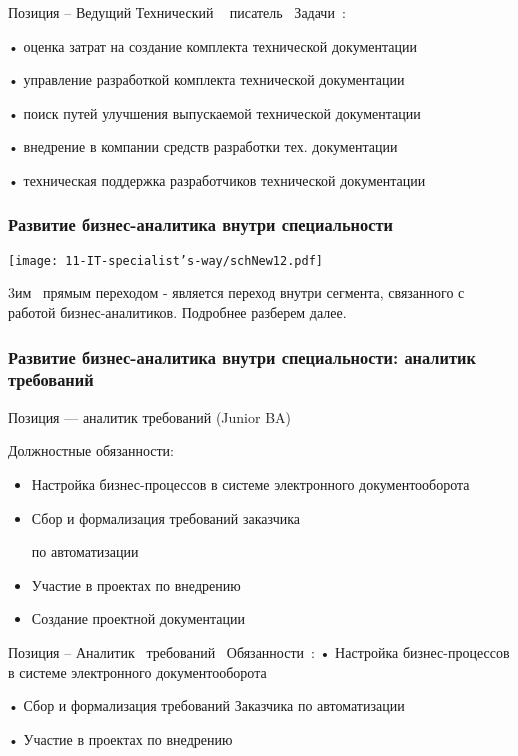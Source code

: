 \documentclass{../industrial-development}
\begin{document}
\lecturenotes

Позиция – Ведущий Технический ~\cite{hh} писатель~\cite{itcf}
Задачи~\cite{rab}:

•	оценка затрат на создание комплекта технической документации 

•	управление разработкой комплекта технической документации

•	поиск путей улучшения выпускаемой технической документации 

•	внедрение в компании средств разработки тех. документации 

•	 техническая поддержка разработчиков технической документации


\begin{frame} \frametitle{Развитие бизнес-аналитика внутри специальности }
  \centerline{\texttt{[image: 11-IT-specialist's-way/schNew12.pdf]}}
\end{frame}

\lecturenotes

 3им~\cite{mc} прямым переходом  - является переход внутри сегмента, связанного с работой бизнес-аналитиков. Подробнее разберем далее.

\begin{frame} \frametitle{Развитие бизнес-аналитика внутри специальности: аналитик требований }
  \begin{block}{}
  \alert{Позиция --- аналитик требований (Junior  BA) }

Должностные обязанности: 
  \end{block}
  \begin{itemize}
  \item  Настройка бизнес-процессов в системе электронного документооборота 
  \item  Сбор и формализация требований заказчика 

по автоматизации
  \item Участие в проектах по внедрению 
 \item Создание проектной документации
  \end{itemize}
\end{frame}


\lecturenotes

Позиция – Аналитик~\cite{hh} требований~\cite{itcf}
Обязанности~\cite{rab}:
•	Настройка бизнес-процессов в системе электронного документооборота 

•	Сбор и формализация требований Заказчика по автоматизации 

•	Участие в проектах по внедрению 
\end{document}

